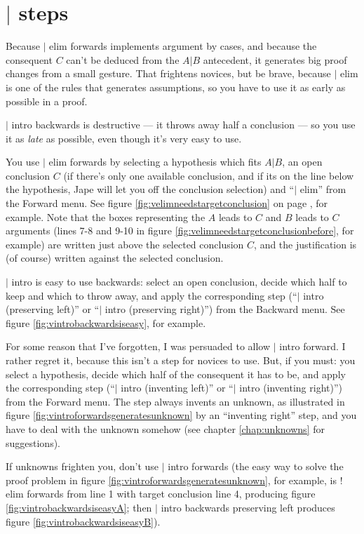\documentclass[11pt]{book}
\newcommand{\figref}[1]{figure \ref{fig:#1}}
\newcommand{\chapref}[1]{chapter \ref{chap:#1}}
\begin{document}
\section{$|$ steps}

Because $|$ elim forwards implements argument by cases, and because the consequent $C$ can't be deduced from the $A|B$ antecedent, it generates big proof changes from a small gesture. That frightens novices, but be brave, because $|$ elim is one of the rules that generates assumptions, so you have to use it as early as possible in a proof.

$|$ intro backwards is destructive --- it throws away half a conclusion --- so you use it as \emph{late} as possible, even though it's very easy to use.

You use $|$ elim forwards by selecting a hypothesis which fits $A|B$, an open conclusion $C$ (if there's only one available conclusion, and if its on the line below the hypothesis, Jape will let you off the conclusion selection) and ``$|$ elim'' from the Forward menu. See \figref{velimneedstargetconclusion} on page \pageref{fig:velimneedstargetconclusion}, for example. Note that the boxes representing the $A$ leads to $C$ and $B$ leads to $C$ arguments (lines 7-8 and 9-10 in \figref{velimneedstargetconclusionbefore}, for example) are written just above the selected conclusion $C$, and the justification is (of course) written against the selected conclusion.

$|$ intro is easy to use backwards: select an open conclusion, decide which half to keep and which to throw away, and apply the corresponding step (``$|$ intro (preserving left)'' or ``$|$ intro (preserving right)'') from the Backward menu. See \figref{vintrobackwardsiseasy}, for example.

For some reason that I've forgotten, I was persuaded to allow $|$ intro forward. I rather regret it, because this isn't a step for novices to use. But, if you must: you select a hypothesis, decide which half of the consequent it has to be, and apply the corresponding step (``$|$ intro (inventing left)'' or ``$|$ intro (inventing right)'') from the Forward menu. The step always invents an unknown, as illustrated in \figref{vintroforwardsgeneratesunknown} by an ``inventing right'' step, and you have to deal with the unknown somehow (see \chapref{unknowns} for suggestions).

If unknowns frighten you, don't use $|$ intro forwards (the easy way to solve the proof problem in \figref{vintroforwardsgeneratesunknown}, for example, is $!$ elim forwards from line 1 with target conclusion line 4, producing \figref{vintrobackwardsiseasyA}; then $|$ intro backwards preserving left produces \figref{vintrobackwardsiseasyB}). 
\end{document}
